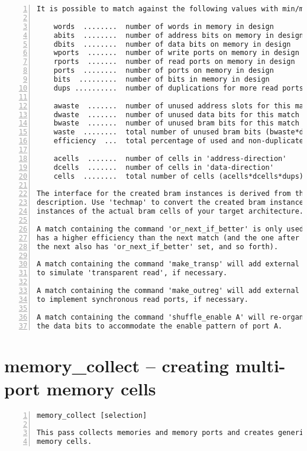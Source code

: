 \begin{lstlisting}[numbers=left,frame=single]
It is possible to match against the following values with min/max rules:

    words  ........  number of words in memory in design
    abits  ........  number of address bits on memory in design
    dbits  ........  number of data bits on memory in design
    wports  .......  number of write ports on memory in design
    rports  .......  number of read ports on memory in design
    ports  ........  number of ports on memory in design
    bits  .........  number of bits in memory in design
    dups ..........  number of duplications for more read ports

    awaste  .......  number of unused address slots for this match
    dwaste  .......  number of unused data bits for this match
    bwaste  .......  number of unused bram bits for this match
    waste  ........  total number of unused bram bits (bwaste*dups)
    efficiency  ...  total percentage of used and non-duplicated bits

    acells  .......  number of cells in 'address-direction'
    dcells  .......  number of cells in 'data-direction'
    cells  ........  total number of cells (acells*dcells*dups)

The interface for the created bram instances is derived from the bram
description. Use 'techmap' to convert the created bram instances into
instances of the actual bram cells of your target architecture.

A match containing the command 'or_next_if_better' is only used if it
has a higher efficiency than the next match (and the one after that if
the next also has 'or_next_if_better' set, and so forth).

A match containing the command 'make_transp' will add external circuitry
to simulate 'transparent read', if necessary.

A match containing the command 'make_outreg' will add external flip-flops
to implement synchronous read ports, if necessary.

A match containing the command 'shuffle_enable A' will re-organize
the data bits to accommodate the enable pattern of port A.
\end{lstlisting}

\section{memory\_collect -- creating multi-port memory cells}
\label{cmd:memory_collect}
\begin{lstlisting}[numbers=left,frame=single]
    memory_collect [selection]

This pass collects memories and memory ports and creates generic multiport
memory cells.
\end{lstlisting}

